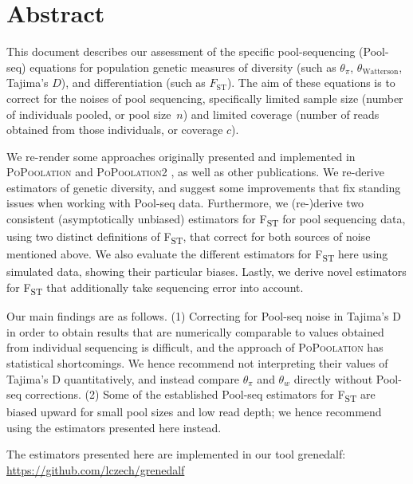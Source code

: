 \documentclass[a4paper,fontsize=9pt,DIV=14]{scrartcl}
\newcommand\toolname{\textsc}
\newcommand{\samplesize}{n}
\newcommand{\coverage}{c}
\newcommand{\fst}{F\textsubscript{ST}}
\newcommand{\mathfst}{F_\text{ST}}
\begin{document}
\section*{Abstract}
\label{supp:sec:Abstract}

This document describes our assessment of the specific pool-sequencing (Pool-seq) equations for population genetic measures of diversity (such as $\theta_\pi$, $\theta_\text{Watterson}$, Tajima's $D$), and differentiation (such as $\mathfst$).
The aim of these equations is to correct for the noises of pool sequencing, specifically limited sample size (number of individuals pooled, or pool size~$\samplesize$) and limited coverage (number of reads obtained from those individuals, or coverage $\coverage$).

We re-render some approaches originally presented and implemented in \toolname{PoPoolation} \cite{Kofler2011a} and \toolname{PoPoolation2} \cite{Kofler2011b}, as well as other publications.  We re-derive estimators of genetic diversity, and suggest some improvements that fix standing issues when working with Pool-seq data. Furthermore, we (re-)derive two consistent (asymptotically unbiased) estimators for \fst{} for pool sequencing data, using two distinct definitions of \fst{}, that correct for both sources of noise mentioned above.  We also evaluate the different estimators for \fst{} here using simulated data, showing their particular biases.  Lastly, we derive novel estimators for \fst{} that additionally take sequencing error into account.  

Our main findings are as follows. (1) Correcting for Pool-seq noise in Tajima's D in order to obtain results that are numerically comparable to values obtained from individual sequencing is difficult, and the approach of \toolname{PoPoolation} has statistical shortcomings. We hence recommend not interpreting their values of Tajima's D quantitatively, and instead compare $\theta_{\pi}$ and $\theta_{w}$ directly without Pool-seq corrections. (2) Some of the established Pool-seq estimators for \fst{} are biased upward for small pool sizes and low read depth; we hence recommend using the estimators presented here instead.

The estimators presented here are implemented in our tool 
grenedalf: \url{https://github.com/lczech/grenedalf}


\end{document}
